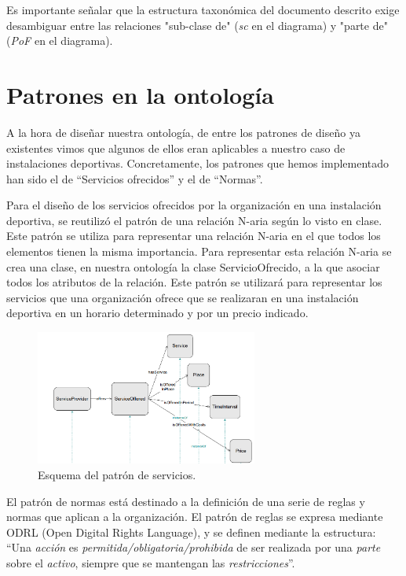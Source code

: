 \documentclass[a4paper,12pt]{article}
\begin{document}
	Es importante señalar que la estructura taxonómica del documento descrito exige desambiguar entre las relaciones "sub-clase de" (\textit{sc} en el diagrama) y "parte de" (\textit{PoF} en el diagrama).
	
	\section{Patrones en la ontología}
	
	A la hora de diseñar nuestra ontología, de entre los patrones de diseño ya existentes vimos que
algunos de ellos eran aplicables a nuestro caso de instalaciones deportivas. Concretamente, los
patrones que hemos implementado han sido el de “Servicios ofrecidos” y el de “Normas”.
	
	Para el diseño de los servicios ofrecidos por la organización en una instalación deportiva, se
reutilizó el patrón de una relación N-aria según lo visto en clase. Este patrón se utiliza para
representar una relación N-aria en el que todos los elementos tienen la misma importancia. Para
representar esta relación N-aria se crea una clase, en nuestra ontología la clase ServicioOfrecido,
a la que asociar todos los atributos de la relación. Este patrón se utilizará para representar los
servicios que una organización ofrece que se realizaran en una instalación deportiva en un horario
determinado y por un precio indicado.
	
	\begin{figure}[H]
		\centering
		\includegraphics[width=0.65\textwidth]{include/patron_servicios.png}
		\caption{Esquema del patrón de servicios.}
	\end{figure}

	El patrón de normas está destinado a la definición de una serie de reglas y normas que aplican a
la organización. El patrón de reglas se expresa mediante ODRL (Open Digital Rights Language),
y se definen mediante la estructura:	“Una \textit{acción} es \textit{permitida/obligatoria/prohibida} de ser realizada por una \textit{parte} sobre el \textit{activo},
siempre que se mantengan las \textit{restricciones}”.
	
\end{document}
